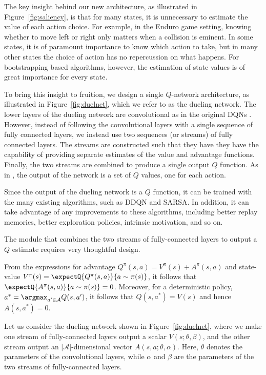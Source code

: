 
The key insight behind our new architecture, as illustrated in Figure~\ref{fig:saliency}, is that for many states, it is unnecessary to estimate the value of each action choice. For example, in the Enduro game setting, knowing whether to move left or right only matters when a collision is eminent. In some states, it is of paramount importance to know which action to take, but in many other states the choice of action has no repercussion on what happens. For bootstrapping based algorithms, however, the estimation of state values is of great importance for every state.

To bring this insight to fruition, we design a single $Q$-network architecture, as illustrated in Figure~\ref{fig:duelnet}, which we refer to as the dueling network. The lower layers of the dueling network are convolutional as in the original DQNs \cite{Mnih:2015}. However, instead of following the convolutional layers with a single sequence of fully connected layers, we instead use two sequences (or streams) of fully connected layers. The streams are constructed such that they have they have the capability of providing separate estimates of the value and advantage functions. Finally, the two streams are combined to produce a single output $Q$ function. As in \cite{Mnih:2015}, the output of the network is a set of $Q$ values, one for each action.

Since the output of the dueling network is a $Q$ function, it can be trained with the many existing algorithms, such as DDQN and SARSA. In addition, it can take advantage of any improvements to these algorithms, including better replay memories, better exploration policies, intrinsic motivation, and so on. 

The module that combines the two streams of fully-connected layers to output a $Q$ estimate requires very thoughtful design.  

From the expressions for advantage $Q^{\pi}(s,a) = V^{\pi}(s) + A^{\pi}(s,a)$ and state-value $V^{\pi}(s) = \expectQ{Q^{\pi}(s,a)}{a \sim \pi(s)}$, it follows that $\expectQ{A^{\pi}(s,a)}{a \sim \pi(s)} = 0$. Moreover, for a deterministic policy, $a^* = \argmax_{a' \in \mathcal{A}} Q(s,a')$, it follows that $Q(s,a^*) = V(s)$ and hence $A(s,a^*)=0$.

Let us consider the dueling network shown in Figure~\ref{fig:duelnet}, where we make one stream of fully-connected layers output a scalar ${V}(s;\theta,\beta)$, and the other stream output an $|\mathcal{A}|$-dimensional vector ${A}(s,a;\theta,\alpha)$. Here, $\theta$ denotes the parameters of the convolutional layers, while $\alpha$ and $\beta$ are the parameters of the two streams of fully-connected layers.


